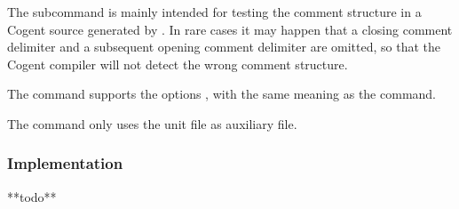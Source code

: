 The subcommand  is mainly intended for testing the comment structure in a Cogent source generated by
. In rare cases it may happen that a closing comment delimiter and a subsequent opening comment delimiter
are omitted, so that the Cogent compiler will not detect the wrong comment structure.

The  command supports the options ,  with the same meaning as
the  command.

The  command only uses the unit file  as auxiliary file.

\subsubsection{Implementation}

**todo**

